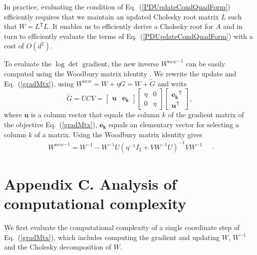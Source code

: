 \documentclass[twoside,11pt]{article}
\newcommand\mat[1]{{#1}}
\renewcommand\vec[1]{\mathbf{#1}}
\newcommand{\T}{{}^\mathsf{T}}
\newcommand{\W}{\mat{W}}
\newcommand{\newW}{{\mat{W^{new}}}}
\newcommand{\cholL}{\mat{L}}
\newcommand{\A}{\mat{A}}
\renewcommand{\eqref}[1]{Eq.~(\ref{#1})}
\begin{document}
In practice, evaluating the condition of \eqref{PDUpdateCondQuadForm} efficiently requires that we maintain an updated Cholesky root matrix $\cholL$ such that $\W = \cholL\T \cholL$. It enables us to efficiently derive a Cholseky root for $\A$ \citep{Davis05rowchol} and in turn to efficiently evaluate the terms of \eqref{PDUpdateCondQuadForm} with a cost of $O(d^2)$. 

To evaluate the $\log\det$ gradient, the new inverse $\newW^{-1}$ can be easily computed using the Woodbury matrix identity \citep{woodbury1950inverting}. We rewrite the update and \eqref{gradMtx}, using $\newW = \W + \eta G = \W+\mat{\widetilde{G}}$
and write
\begin{equation}
  \mat{\widetilde{G}} = \mat{U}\mat{C}\mat{V} = \left[ \begin{matrix}
      \vec{u} & \vec{e_k} \end{matrix} \right] \left[ \begin{matrix}
      \eta & 0 \\ 0 & \eta \end{matrix} \right] \left[ \begin{matrix}
      \vec{e_k}\T \\ \vec{u}\T \end{matrix} \right],
  \label{gradMtxWDB}
  \nonumber 
\end{equation}
where $\vec{u}$ is a column vector that equals the column $k$ of the gradient matrix of the objective \eqref{gradMtx},
$\vec{e_k}$ equals an elementary vector for selecting a column $k$ of
a matrix. 
Using the Woodbury matrix identity gives 
\begin{equation}
    \begin{array}{lcl}
    \newW^{-1} = 
    \W^{-1} - \W^{-1} \mat{U} (\eta^{-1} I_2 + \mat{V}     \W^{-1} \mat{U})^{-1} \mat{V} \W^{-1}
    \end{array}
    \nonumber \quad.
    \label{InvWwdb}
\end{equation}


\section*{Appendix C. Analysis of computational complexity}
We first evaluate the computational complexity of a single coordinate step of  \eqref{gradMtx}, which includes computing the gradient and updating $\W$, $\W^{-1}$ and the Cholesky decomposition of $\W$.
\end{document}
